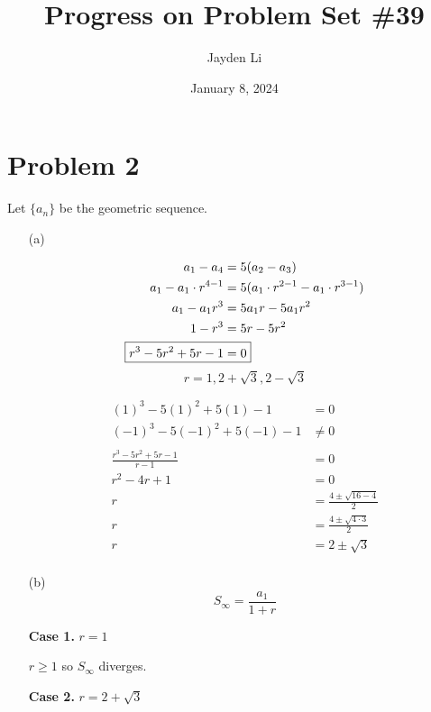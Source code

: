 \documentclass{article}
\title{Progress on Problem Set \#39}
\author{Jayden Li}
\date{January 8, 2024}
\begin{document}
\maketitle

\section*{Problem 2}
Let $\{a_n\}$ be the geometric sequence.
\begin{itemize}
\item[(a)]
\setlength{\abovedisplayskip}{0pt}
\begin{minipage}[t]{0.49\linewidth}
	\begin{align*}
		a_1-a_4&=5(a_2-a_3) \\
		a_1-a_1\cdot r^{4-1}&=5(a_1\cdot r^{2-1}-a_1\cdot r^{3-1}) \\
		a_1-a_1r^3&=5a_1r-5a_1r^2 \\
		1-r^3&=5r-5r^2 \\
		\Aboxed{r^3-5r^2+5r-1&=0} \\
	\end{align*}
	\begin{equation*}
		\boxed{r=1,2+\sqrt{3},2-\sqrt{3}}
	\end{equation*}
\end{minipage}
\begin{minipage}[t]{0.5\linewidth}
	\begin{align*}
		(1)^3-5(1)^2+5(1)-1&=0 \\
		(-1)^3-5(-1)^2+5(-1)-1&\neq0 \\
		\\
		\frac{r^3-5r^2+5r-1}{r-1}&=0 \\
		r^2-4r+1&=0 \\
		r&=\frac{4\pm\sqrt{16-4}}{2} \\
		r&=\frac{4\pm\sqrt{4\cdot3}}{2} \\
		r&=2\pm\sqrt3 \\
	\end{align*}
\end{minipage}

\item[(b)]
\begin{equation*}
	S_\infty=\frac{a_1}{1+r}
\end{equation*}
\centering
\begin{minipage}[t]{0.25\linewidth}
	\textbf{Case 1.} $r=1$

	$r\geq1$ so $S_\infty$ diverges.
\end{minipage}
\quad
\begin{minipage}[t]{0.25\linewidth}
	\textbf{Case 2.} $r=2+\sqrt{3}$


\end{minipage}
\end{itemize}
\end{document}
